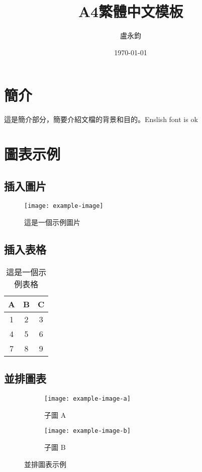 \documentclass{article}
\title{A4繁體中文模板}
\author{盧永鈞}
\date{\today}
\begin{document}
	
\maketitle %

	
	
\tableofcontents %
	
\section{簡介}
這是簡介部分，簡要介紹文檔的背景和目的。Enslish font is ok
	
\section{圖表示例}
	
\subsection{插入圖片}
\begin{figure}[h]
	\centering
	\texttt{[image: example-image]} %
	\caption{這是一個示例圖片}
	\label{fig:example}
\end{figure}
	
\subsection{插入表格}
\begin{table}[h]
	\centering
	\begin{tabular}{|c|c|c|}
		\hline
		A & B & C \\
		\hline
		1 & 2 & 3 \\
		4 & 5 & 6 \\
		7 & 8 & 9 \\
		\hline
	\end{tabular}
	\caption{這是一個示例表格}
	\label{tab:example}
\end{table}
	
\subsection{並排圖表}
\begin{figure}[h]
	\centering
	\begin{subfigure}{0.45\textwidth}
		\centering
		\texttt{[image: example-image-a]} %
		\caption{子圖 A}
	\end{subfigure}
	\hfill
	\begin{subfigure}{0.45\textwidth}
		\centering
		\texttt{[image: example-image-b]} %
		\caption{子圖 B}
	\end{subfigure}
	\caption{並排圖表示例}
	\label{fig:sidebyside}
\end{figure}
	
\end{document}
